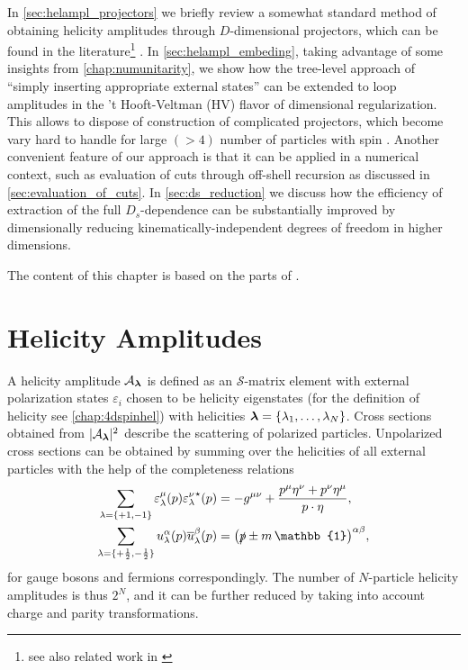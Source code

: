 In \cref{sec:helampl_projectors} we briefly review a somewhat standard 
method of obtaining helicity amplitudes through $D$-dimensional projectors,
which can be found in the literature\footnote{
  see also related work in \cite{Chen:2019wyb,Boels:2018nrr} 
} \cite{Garland:2002ak, Moch:2002hm, Glover:2003cm, Glover:2004si,Gehrmann:2009vu,Gehrmann:2011aa}.
In \cref{sec:helampl_embeding}, 
taking advantage of some insights from \cref{chap:numunitarity},
we show how the tree-level approach of ``simply inserting appropriate external states'' can
be extended to loop amplitudes in the 't Hooft-Veltman (HV) flavor of dimensional regularization.
This allows to dispose of construction of complicated projectors, which
become vary hard to handle for large $(> 4)$ number of particles with spin \cite{Peraro:2019cjj}. 
Another convenient feature of our approach is that it can be applied in a numerical context, such
as evaluation of cuts through off-shell recursion as discussed in \cref{sec:evaluation_of_cuts}.
In \cref{sec:ds_reduction} we discuss how
the efficiency of extraction of the full $D_s$-dependence can be substantially improved
by dimensionally reducing kinematically-independent degrees of freedom in higher dimensions.

The content of this chapter is based on the parts of \cite{Anger:2018ove,Abreu:2018jgq,Abreu:2019odu}.

\section{Helicity Amplitudes}
\label{sec:HV_helicity_amplitudes}

A helicity amplitude $\mathcal{A}_{\vb*{\lambda}}$
is defined as an $\mathcal{S}$-matrix element
with external polarization states $\varepsilon_{i}$ chosen to be
helicity eigenstates (for the definition of helicity see \cref{chap:4dspinhel}) with helicities $\vb*{\lambda}=\{\lambda_1,\ldots{},\lambda_N\}$.
Cross sections obtained from $\vert \mathcal{A}_{\vb*{\lambda}}{} \vert^2$ describe
the scattering of polarized particles.
Unpolarized cross sections can be obtained by summing over the helicities of all external particles
with the help of the completeness relations
\begin{subequations}
  \label{eq:4d_completeness_relations}
  \begin{align}
    \sum_{\lambda=\{+1,-1\}} \varepsilon^\mu_\lambda(p){\varepsilon^\nu_\lambda}^{\star{}}(p)  &= -g^{\mu\nu} + \frac{p^\mu \eta^\nu + p^\nu \eta^\mu}{\sp(p,\eta)}, \\
    \sum_{\lambda=\{+\frac{1}{2},-\frac{1}{2}\}} u^\alpha_\lambda(p){\overline{u}_\lambda^\beta}(p)  &= \qty(\slashed{p}  \pm m\,\mathbb{1})^{\alpha\beta},
  \end{align}
\end{subequations}
for gauge bosons and fermions correspondingly.
The number of $N$-particle helicity amplitudes is thus $2^N$, and
it can be further reduced by taking into account charge and parity transformations.


